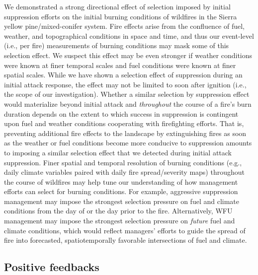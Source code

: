 \documentclass[twoside,12pt,final]{ucthesis-CA2012}
\begin{document}
\begin{ucmainmatter}
We demonstrated a strong directional effect of selection imposed by
initial suppression efforts on the initial burning conditions of
wildfires in the Sierra yellow pine/mixed-conifer system. Fire effects
arise from the confluence of fuel, weather, and topographical conditions
in space and time, and thus our event-level (i.e., per fire)
measurements of burning conditions may mask some of this selection
effect. We suspect this effect may be even stronger if weather
conditions were known at finer temporal scales and fuel conditions were
known at finer spatial scales. While we have shown a selection effect of
suppression during an initial attack response, the effect may not be
limited to soon after ignition (i.e., the scope of our investigation).
Whether a similar selection by suppression effect would materialize
beyond initial attack and \emph{throughout} the course of a fire's burn
duration depends on the extent to which success in suppression is
contingent upon fuel and weather conditions cooperating with
firefighting efforts. That is, preventing additional fire effects to the
landscape by extinguishing fires as soon as the weather or fuel
conditions become more conducive to suppression amounts to imposing a
similar selection effect that we detected during initial attack
suppression. Finer spatial and temporal resolution of burning conditions
(e.g., daily climate variables paired with daily fire spread/severity
maps) throughout the course of wildfires may help tune our understanding
of how management efforts can select for burning conditions. For
example, aggressive suppression management may impose the strongest
selection pressure on fuel and climate conditions from the day of or the
day prior to the fire. Alternatively, WFU management may impose the
strongest selection pressure on \emph{future} fuel and climate
conditions, which would reflect managers' efforts to guide the spread of
fire into forecasted, spatiotemporally favorable intersections of fuel
and climate.

\subsection{Positive feedbacks}\label{positive-feedbacks}


\end{ucmainmatter}
\end{document}
